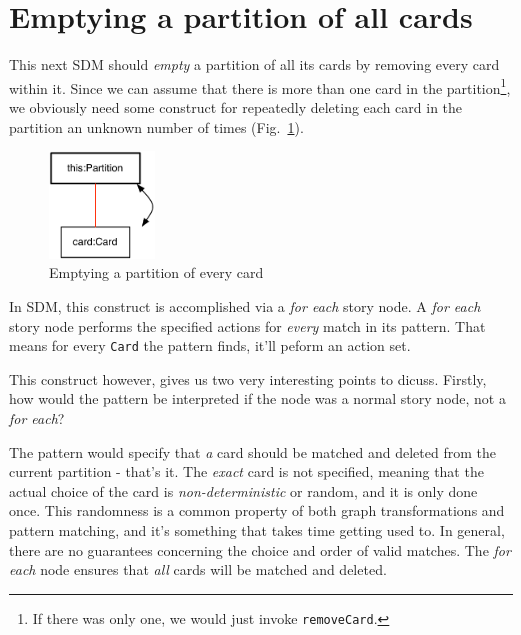 \newpage
\section{Emptying a partition of all cards}
\genHeader
\hypertarget{sec:emptyPartition}{}

This next SDM should \emph{empty} a partition of all its cards by removing every card within it. Since we can assume that there is more than one card in the
partition\footnote{If there was only one, we would just invoke \texttt{removeCard}.}, we obviously need some construct for repeatedly deleting each card in the
partition an unknown number of times (Fig.~\ref{fig:goal_empty}). 

\vspace{0.5cm}

\begin{figure}[htbp]
	\centering
  \includegraphics[width=0.25\textwidth]{empty.pdf}
	\caption{Emptying a partition of every card}
	\label{fig:goal_empty}
\end{figure}
\FloatBarrier

\vspace{0.5cm}

In SDM, this  construct is accomplished via a \emph{for each} story node. A
\emph{for each} story node performs the specified actions for \emph{every} match in its pattern. That means for every \texttt{Card} the pattern finds, it'll
peform an action set.

This construct however, gives us two very interesting points to dicuss. Firstly, how would the pattern be interpreted if the node was a normal story node, not a
\emph{for each}?

The pattern would specify that \emph{a} card should be matched and deleted from the current partition - that's it. The \emph{exact} card is not specified,
meaning that the actual choice of the card is \emph{non-deterministic} or random, and it is only done once. This randomness is a common property of both graph
transformations and pattern matching, and it's something that takes time getting used to.  In general, there are no guarantees concerning the choice and
order of valid matches. The \emph{for each} node ensures that \emph{all} cards will be matched and deleted.

